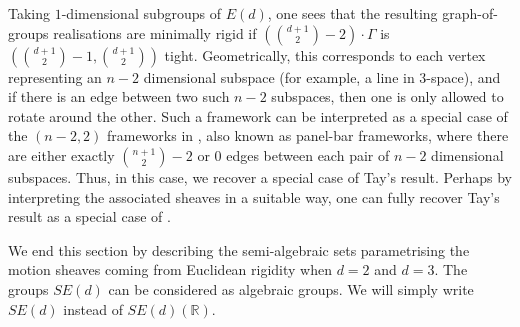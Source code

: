 \documentclass{article}
\theoremstyle{definition}
\theoremstyle{remark}
\begin{document}
Taking $1$-dimensional subgroups of $E(d)$, one sees that the resulting graph-of-groups realisations are minimally rigid if $\left(\binom{d+1}{2} - 2\right)\cdot \Gamma$ is $\left(\binom{d+1}{2} - 1, \binom{d+1}{2}\right)$ tight. Geometrically, this corresponds to each vertex representing an $n-2$ dimensional subspace (for example, a line in $3$-space), and if there is an edge between two such $n-2$ subspaces, then one is only allowed to rotate around the other. Such a framework can be interpreted as a special case of the $(n-2, 2)$ frameworks in \cite{Tay1989}, also known as panel-bar frameworks, where there are either exactly $\binom{n+1}{2}- 2$ or $0$ edges between each pair of $n-2$ dimensional subspaces. Thus, in this case, we recover a special case of Tay's result. Perhaps by interpreting the associated sheaves in a suitable way, one can fully recover Tay's result as a special case of .

We end this section by describing the semi-algebraic sets parametrising the motion sheaves coming from Euclidean rigidity when $d=2$ and $d=3$. The groups $SE(d)$ can be considered as algebraic groups. We will simply write $SE(d)$ instead of $SE(d)(\mathbb{R})$.
\end{document}
